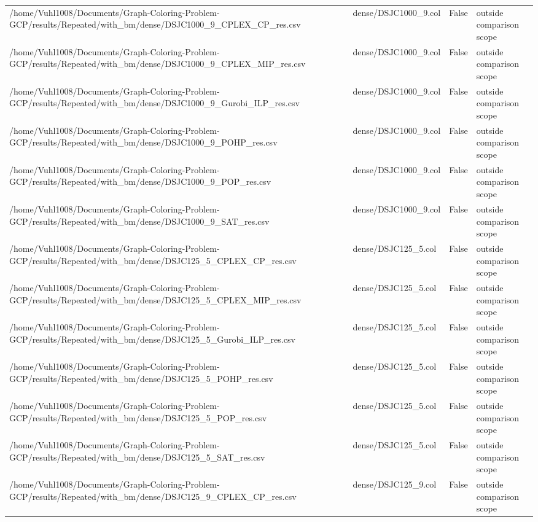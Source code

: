 \begin{table}[htbp]
\begin{tabular}{llll}
/home/Vuhl1008/Documents/Graph-Coloring-Problem-GCP/results/Repeated/with\_bm/dense/DSJC1000\_9\_CPLEX\_CP\_res.csv & dense/DSJC1000\_9.col & False & outside comparison scope \\
/home/Vuhl1008/Documents/Graph-Coloring-Problem-GCP/results/Repeated/with\_bm/dense/DSJC1000\_9\_CPLEX\_MIP\_res.csv & dense/DSJC1000\_9.col & False & outside comparison scope \\
/home/Vuhl1008/Documents/Graph-Coloring-Problem-GCP/results/Repeated/with\_bm/dense/DSJC1000\_9\_Gurobi\_ILP\_res.csv & dense/DSJC1000\_9.col & False & outside comparison scope \\
/home/Vuhl1008/Documents/Graph-Coloring-Problem-GCP/results/Repeated/with\_bm/dense/DSJC1000\_9\_POHP\_res.csv & dense/DSJC1000\_9.col & False & outside comparison scope \\
/home/Vuhl1008/Documents/Graph-Coloring-Problem-GCP/results/Repeated/with\_bm/dense/DSJC1000\_9\_POP\_res.csv & dense/DSJC1000\_9.col & False & outside comparison scope \\
/home/Vuhl1008/Documents/Graph-Coloring-Problem-GCP/results/Repeated/with\_bm/dense/DSJC1000\_9\_SAT\_res.csv & dense/DSJC1000\_9.col & False & outside comparison scope \\
/home/Vuhl1008/Documents/Graph-Coloring-Problem-GCP/results/Repeated/with\_bm/dense/DSJC125\_5\_CPLEX\_CP\_res.csv & dense/DSJC125\_5.col & False & outside comparison scope \\
/home/Vuhl1008/Documents/Graph-Coloring-Problem-GCP/results/Repeated/with\_bm/dense/DSJC125\_5\_CPLEX\_MIP\_res.csv & dense/DSJC125\_5.col & False & outside comparison scope \\
/home/Vuhl1008/Documents/Graph-Coloring-Problem-GCP/results/Repeated/with\_bm/dense/DSJC125\_5\_Gurobi\_ILP\_res.csv & dense/DSJC125\_5.col & False & outside comparison scope \\
/home/Vuhl1008/Documents/Graph-Coloring-Problem-GCP/results/Repeated/with\_bm/dense/DSJC125\_5\_POHP\_res.csv & dense/DSJC125\_5.col & False & outside comparison scope \\
/home/Vuhl1008/Documents/Graph-Coloring-Problem-GCP/results/Repeated/with\_bm/dense/DSJC125\_5\_POP\_res.csv & dense/DSJC125\_5.col & False & outside comparison scope \\
/home/Vuhl1008/Documents/Graph-Coloring-Problem-GCP/results/Repeated/with\_bm/dense/DSJC125\_5\_SAT\_res.csv & dense/DSJC125\_5.col & False & outside comparison scope \\
/home/Vuhl1008/Documents/Graph-Coloring-Problem-GCP/results/Repeated/with\_bm/dense/DSJC125\_9\_CPLEX\_CP\_res.csv & dense/DSJC125\_9.col & False & outside comparison scope \\

\end{tabular}
\end{table}
